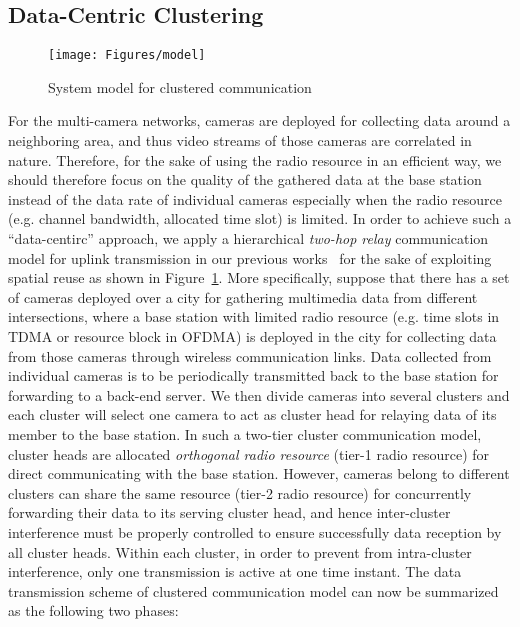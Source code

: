 \subsection{Data-Centric Clustering}
\label{sec::dcClustering}
%
\begin{figure}
\centering
\texttt{[image: Figures/model]}
\caption{\label{fig::dcModel}System model for clustered communication}
\end{figure}
%
For the multi-camera networks, cameras are deployed for collecting data around a neighboring area, and thus video streams of those cameras are correlated in nature.
Therefore, for the sake of using the radio resource in an efficient way, we should therefore focus on the quality of the gathered data at the base station instead of the data rate of individual cameras especially when the radio resource (e.g. channel bandwidth, allocated time slot) is limited.
In order to achieve such a ``data-centirc'' approach, we apply a hierarchical \emph{two-hop relay} communication model for uplink transmission in our previous works~\cite{steven} for the sake of exploiting spatial reuse as shown in Figure~\ref{fig::dcModel}.
More specifically, suppose that there has a set of cameras deployed over a city for gathering multimedia data from different intersections, where a base station with limited radio resource (e.g. time slots in TDMA or resource block in OFDMA) is deployed in the city for collecting data from those cameras through wireless communication links.
Data collected from individual cameras is to be periodically transmitted back to the base station for forwarding to a back-end server.
We then divide cameras into several clusters and each cluster will select one camera to act as cluster head for relaying data of its member to the base station.
In such a two-tier cluster communication model, cluster heads are allocated \emph{orthogonal radio resource} (tier-1 radio resource) for direct communicating with the base station.
However, cameras belong to different clusters can share the same resource (tier-2 radio resource) for concurrently forwarding their data to its serving cluster head, and hence inter-cluster interference must be properly controlled to ensure successfully data reception by all cluster heads. 
Within each cluster, in order to prevent from intra-cluster interference, only one transmission is active at one time instant.
The data transmission scheme of clustered communication model can now be summarized as the following two phases:
